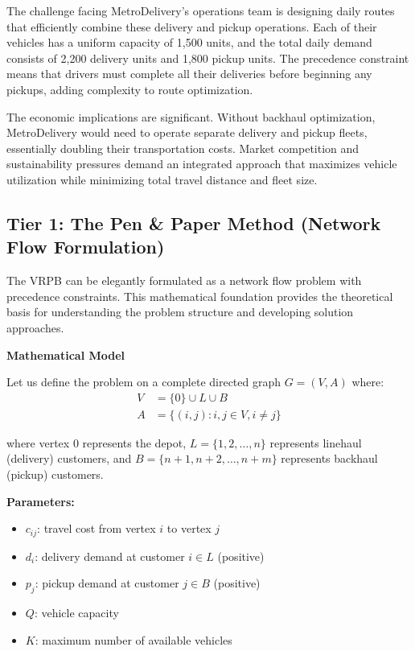 \documentclass{article}
\begin{document}
The challenge facing MetroDelivery's operations team is designing daily routes that efficiently combine these delivery and pickup operations. Each of their vehicles has a uniform capacity of 1,500 units, and the total daily demand consists of 2,200 delivery units and 1,800 pickup units. The precedence constraint means that drivers must complete all their deliveries before beginning any pickups, adding complexity to route optimization.

The economic implications are significant. Without backhaul optimization, MetroDelivery would need to operate separate delivery and pickup fleets, essentially doubling their transportation costs. Market competition and sustainability pressures demand an integrated approach that maximizes vehicle utilization while minimizing total travel distance and fleet size.

\subsection{Tier 1: The Pen \& Paper Method (Network Flow Formulation)}

The VRPB can be elegantly formulated as a network flow problem with precedence constraints. This mathematical foundation provides the theoretical basis for understanding the problem structure and developing solution approaches.

\textbf{Mathematical Model}

Let us define the problem on a complete directed graph \( G = (V, A) \) where:
\begin{align}
V &= \{0\} \cup L \cup B \\
A &= \{(i,j) : i, j \in V, i \neq j\}
\end{align}

where vertex 0 represents the depot, \( L = \{1, 2, \ldots, n\} \) represents linehaul (delivery) customers, and \( B = \{n+1, n+2, \ldots, n+m\} \) represents backhaul (pickup) customers.

\textbf{Parameters:}
\begin{itemize}
\item \( c_{ij} \): travel cost from vertex \( i \) to vertex \( j \)
\item \( d_i \): delivery demand at customer \( i \in L \) (positive)
\item \( p_j \): pickup demand at customer \( j \in B \) (positive)
\item \( Q \): vehicle capacity
\item \( K \): maximum number of available vehicles
\end{itemize}
\end{document}
